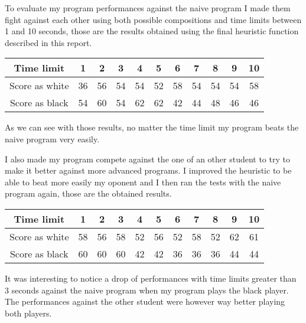 To evaluate my program performances against the naive program I made them fight against each other using both possible compositions and time limits between 1 and 10 seconds, those are the results obtained using the final heuristic function described in this report.

\begin{center}
    \begin{tabular}{ c | c c c c c c c c c c } 
        Time limit & 1 & 2 & 3 & 4 & 5 & 6 & 7 & 8 & 9 & 10\\
        \hline
        Score as white & 36 & 56 & 54 & 54 & 52 & 58 & 54 & 54 & 54 & 58\\
        Score as black & 54 & 60 & 54 & 62 & 62 & 42 & 44 & 48 & 46 & 46\\
    \end{tabular}
\end{center}

As we can see with those results, no matter the time limit my program beats the naive program very easily.

I also made my program compete against the one of an other student to try to make it better against more advanced programs.
I improved the heuristic to be able to beat more easily my oponent and I then ran the tests with the naive program again, those are the obtained results.

\begin{center}
    \begin{tabular}{ c | c c c c c c c c c c } 
        Time limit & 1 & 2 & 3 & 4 & 5 & 6 & 7 & 8 & 9 & 10\\
        \hline
        Score as white & 58 & 56 & 58 & 52 & 56 & 52 & 58 & 52 & 62 & 61\\
        Score as black & 60 & 60 & 60 & 42 & 42 & 36 & 36 & 36 & 44 & 44\\
    \end{tabular}
\end{center}

It was interesting to notice a drop of performances with time limits greater than 3 seconds against the naive program when my program plays the black player.
The performances against the other student were however way better playing both players.
